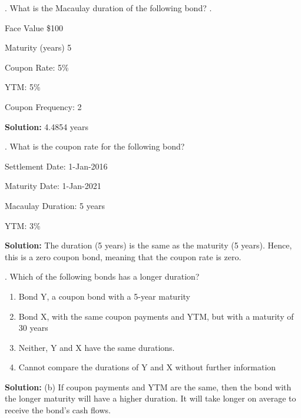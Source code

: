 \documentclass[11.5pt]{article}
\begin{document}
\vspace{30pt}



. What is the Macaulay duration of the following bond? .

Face Value \$100

Maturity (years) 5

Coupon Rate: 5\%

YTM: 5\%

Coupon Frequency: 2


\textbf{Solution:}  4.4854 years

\vspace{50pt}

\newpage



. What is the coupon rate for the following bond?

Settlement Date: 1-Jan-2016

Maturity Date: 1-Jan-2021

Macaulay Duration: 5 years

YTM: 3\%


\noindent \textbf{Solution:}  The duration (5 years) is the same as the maturity (5 years). Hence, this is a zero coupon bond, meaning that the coupon rate is zero.

\vspace{30pt}






. Which of the following bonds has a longer duration?


\begin{enumerate}[a]
	
	\item Bond Y, a coupon bond with a 5-year maturity
	
	\item Bond X, with the same coupon payments and YTM, but with a maturity of 30 years
	
	\item Neither, Y and X have the same durations.
	
	\item Cannot compare the durations of Y and X without further information
\end{enumerate}


\noindent \textbf{Solution:} (b) If coupon payments and YTM are the same, then the bond with the longer maturity will have a higher duration. It will take longer on average to receive the bond’s cash flows.
\end{document}
